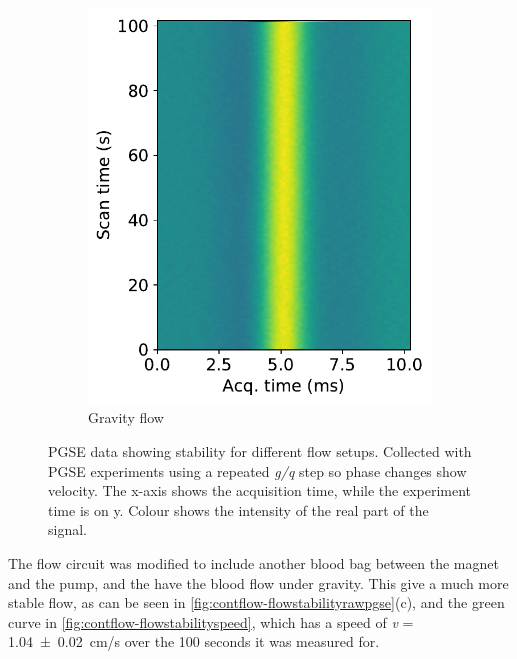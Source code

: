 \begin{figure}[htb]
\begin{subfigure}[t]{0.32\textwidth}
\end{subfigure}
\begin{subfigure}[t]{0.32\textwidth}
\caption{Gravity flow}
\includegraphics[width=\textwidth]{figures/contflow/flowstabilitynewsetup.pdf}
\end{subfigure}

\caption[PGSE data showing flow stability]{PGSE data showing stability for different flow setups. Collected with PGSE experiments using a repeated \textit{g/q} step so phase changes show velocity. The x-axis shows the acquisition time, while the experiment time is on y. Colour shows the intensity of the real part of the signal.}
\label{fig:contflow-flowstabilityrawpgse}
\end{figure}

The flow circuit was modified to include another blood bag between the magnet and the pump, and the have the blood flow under gravity.
This give a much more stable flow, as can be seen in \autoref{fig:contflow-flowstabilityrawpgse}(c), and the green curve in \autoref{fig:contflow-flowstabilityspeed}, which has a speed of \textit{v} = \SI{1.04\pm0.02}{cm/s} over the 100 seconds it was measured for.

